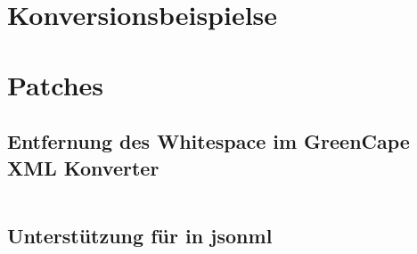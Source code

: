 \chapter{Konversionsbeispielse}
\label{appx:convexamples}


\chapter{Patches}
\label{appx:patches}

\section{Entfernung des Whitespace im GreenCape XML Konverter}
\label{appx:greencapexml}

\inputminted[breakautoindent=false]{udiff}{patches/greencapexml-noindent.patch}

\section{Unterstützung für  in \acrshort{jsonml}}
\label{appx:jsonmlpi}

\inputminted[breakautoindent=false]{udiff}{patches/jsonml-pi.patch}
